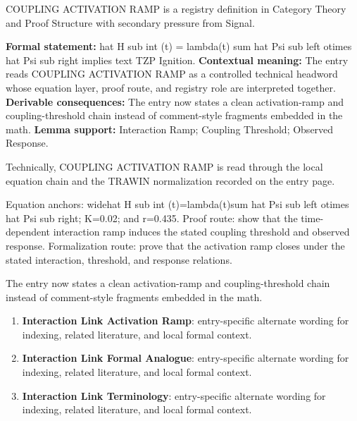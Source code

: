 
\begingroup\small
{}
COUPLING ACTIVATION RAMP is a registry definition in Category Theory and Proof Structure with secondary pressure from Signal.

\begingroup\footnotesize\setlength{\emergencystretch}{3em}\sloppy
\textbf{Formal statement:} hat H sub int (t) = lambda(t) sum hat Psi sub left otimes hat Psi sub right implies text TZP Ignition. \textbf{Contextual meaning:} The entry reads COUPLING ACTIVATION RAMP as a controlled technical headword whose equation layer, proof route, and registry role are interpreted together. \textbf{Derivable consequences:} The entry now states a clean activation-ramp and coupling-threshold chain instead of comment-style fragments embedded in the math. \textbf{Lemma support:} Interaction Ramp; Coupling Threshold; Observed Response.\par
\endgroup

Technically, COUPLING ACTIVATION RAMP is read through the local equation chain and the TRAWIN normalization recorded on the entry page.

Equation anchors: widehat H sub int (t)=lambda(t)sum hat Psi sub left otimes hat Psi sub right; K=0.02; and r=0.435. Proof route: show that the time-dependent interaction ramp induces the stated coupling threshold and observed response. Formalization route: prove that the activation ramp closes under the stated interaction, threshold, and response relations.

The entry now states a clean activation-ramp and coupling-threshold chain instead of comment-style fragments embedded in the math.
\endgroup

\begin{enumerate}[leftmargin=1.6em,itemsep=6pt,topsep=4pt]
\item \textbf{Interaction Link Activation Ramp}: entry-specific alternate wording for indexing, related literature, and local formal context.
\item \textbf{Interaction Link Formal Analogue}: entry-specific alternate wording for indexing, related literature, and local formal context.
\item \textbf{Interaction Link Terminology}: entry-specific alternate wording for indexing, related literature, and local formal context.
\end{enumerate}

